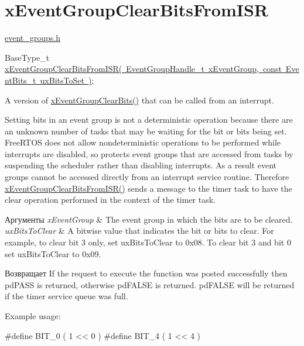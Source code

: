 \hypertarget{group__x_event_group_clear_bits_from_i_s_r}{}\section{x\+Event\+Group\+Clear\+Bits\+From\+I\+SR}
\label{group__x_event_group_clear_bits_from_i_s_r}
\mbox{\hyperlink{event__groups_8h}{event\+\_\+groups.\+h}} 
\begin{DoxyPre}
   BaseType\_t \mbox{\hyperlink{event__groups_8h_a3d7de214a697f33fe7b914e26a93f33a}{xEventGroupClearBitsFromISR( EventGroupHandle\_t xEventGroup, const EventBits\_t uxBitsToSet )}};
\end{DoxyPre}


A version of \mbox{\hyperlink{event__groups_8h_a0fb72cfdd4f0d5f86d955fc3af448f2a}{x\+Event\+Group\+Clear\+Bits()}} that can be called from an interrupt.

Setting bits in an event group is not a deterministic operation because there are an unknown number of tasks that may be waiting for the bit or bits being set. Free\+R\+T\+OS does not allow nondeterministic operations to be performed while interrupts are disabled, so protects event groups that are accessed from tasks by suspending the scheduler rather than disabling interrupts. As a result event groups cannot be accessed directly from an interrupt service routine. Therefore \mbox{\hyperlink{event__groups_8h_a3d7de214a697f33fe7b914e26a93f33a}{x\+Event\+Group\+Clear\+Bits\+From\+I\+S\+R()}} sends a message to the timer task to have the clear operation performed in the context of the timer task.


\begin{DoxyParams}{Аргументы}
{\em x\+Event\+Group} & The event group in which the bits are to be cleared.\\
\hline
{\em ux\+Bits\+To\+Clear} & A bitwise value that indicates the bit or bits to clear. For example, to clear bit 3 only, set ux\+Bits\+To\+Clear to 0x08. To clear bit 3 and bit 0 set ux\+Bits\+To\+Clear to 0x09.\\
\hline
\end{DoxyParams}
\begin{DoxyReturn}{Возвращает}
If the request to execute the function was posted successfully then pd\+P\+A\+SS is returned, otherwise pd\+F\+A\+L\+SE is returned. pd\+F\+A\+L\+SE will be returned if the timer service queue was full.
\end{DoxyReturn}
Example usage\+: 
\begin{DoxyPre}
  \#define BIT\_0 ( 1 << 0 )
  \#define BIT\_4 ( 1 << 4 )\end{DoxyPre}



